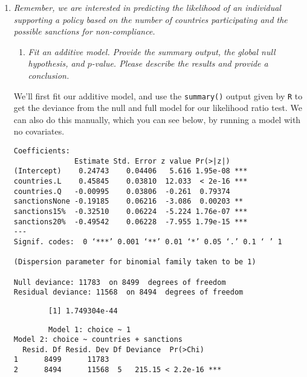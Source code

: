 \documentclass[12pt,letterpaper]{article}
\begin{document}
\begin{enumerate}
	\item
	\textit{Remember, we are interested in predicting the likelihood of an individual supporting a policy based on the number of countries participating and the possible sanctions for non-compliance.}
	\begin{enumerate}
		\item [] \textit{Fit an additive model. Provide the summary output, the global null hypothesis, and $p$-value. Please describe the results and provide a conclusion.}
	\end{enumerate}
	
		We’ll first fit our additive model, and use the \texttt{summary()} output given by \texttt{R} to get the deviance from the null and full model for our likelihood ratio test. We can also do this manually, which you can see below, by running a model with no covariates.
		
	 
	
	\begin{verbatim}
Coefficients:
              Estimate Std. Error z value Pr(>|z|)    
(Intercept)    0.24743    0.04406   5.616 1.95e-08 ***
countries.L    0.45845    0.03810  12.033  < 2e-16 ***
countries.Q   -0.00995    0.03806  -0.261  0.79374    
sanctionsNone -0.19185    0.06216  -3.086  0.00203 ** 
sanctions15%  -0.32510    0.06224  -5.224 1.76e-07 ***
sanctions20%  -0.49542    0.06228  -7.955 1.79e-15 ***
---
Signif. codes:  0 ‘***’ 0.001 ‘**’ 0.01 ‘*’ 0.05 ‘.’ 0.1 ‘ ’ 1

(Dispersion parameter for binomial family taken to be 1)

Null deviance: 11783  on 8499  degrees of freedom
Residual deviance: 11568  on 8494  degrees of freedom\end{verbatim}
	
	 
	
	\begin{verbatim}
		[1] 1.749304e-44
	\end{verbatim}

	 
	
	\begin{verbatim}
		Model 1: choice ~ 1
Model 2: choice ~ countries + sanctions
  Resid. Df Resid. Dev Df Deviance  Pr(>Chi)    
1      8499      11783                          
2      8494      11568  5   215.15 < 2.2e-16 ***
	\end{verbatim}
	

\end{enumerate}
\end{document}
